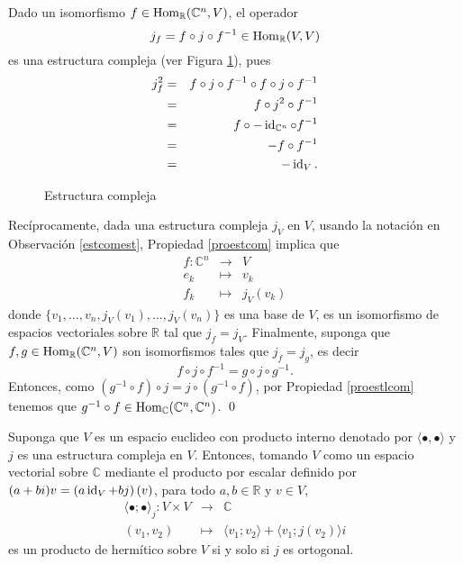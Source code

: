 \dem Dado un isomorfismo $f\in\operatorname{Hom}_{\mathbb{R}}(\mathbb{C}^n,V)$, el operador
\[
j_f=f\circ j\circ f^{-1}\in\operatorname{Hom}_\mathbb{R}(V,V)
\]
es una estructura compleja (ver Figura \ref{estcomp}), pues
\begin{eqnarray*}
j_f^2 & = & f\circ j\circ f^{-1}\circ f\circ j\circ f^{-1}\\
         & = & f\circ j^2\circ f^{-1}\\
         & = & f\circ-\operatorname{id}_{\mathbb{C}^n}\circ f^{-1}\\
         & = & -f\circ f^{-1}\\
         & = & -\operatorname{id}_V.
\end{eqnarray*}
\begin{figure}[!hbp]
\centering
{}
\caption{Estructura compleja}
\label{estcomp}
\end{figure}
Rec\'iprocamente, dada una estructura compleja $j_V$ en $V$, usando la notaci\'on en Observaci\'on \ref{estcomest}, Propiedad \ref{proestcom} implica que
\begin{eqnarray*}
f:\mathbb{C}^n & \longrightarrow & V\\
e_k &\longmapsto & v_k\\
f_k &\longmapsto & j_V(v_k)
\end{eqnarray*}
donde $\{v_1,\ldots,v_n,j_V(v_1),\ldots,j_V(v_n)\}$ es una base de $V$, es un isomorfismo de espacios vectoriales sobre $\mathbb{R}$ tal que $j_f=j_V$. Finalmente, suponga que $f,g\in\operatorname{Hom}_{\mathbb{R}}(\mathbb{C}^n,V)$ son isomorfismos tales que $j_f=j_g$, es decir
$$f\circ j\circ f^{-1}=g\circ j\circ g^{-1}.$$
Entonces, como $(g^{-1}\circ f)\circ j=j\circ (g^{-1}\circ f)$, por Propiedad \ref{proestlcom} tenemos que $g^{-1}\circ f\in\operatorname{Hom}_{\mathbb{C}}(\mathbb{C}^n,\mathbb{C}^n)$. \qed

\begin{pro}
Suponga que $V$ es un espacio euclideo con producto interno denotado por $\langle\bullet,\bullet\rangle$ y $j$ es una estructura compleja en $V$. Entonces, tomando $V$ como un espacio vectorial sobre $\mathbb{C}$ mediante el producto por escalar definido por $(a+bi)v=\left(a\operatorname{id}_V+bj\right)(v)$, para todo $a,b\in\mathbb{R}$ y $v\in V$,
\begin{eqnarray*}
\langle\bullet;\bullet\rangle_j: V\times V & \longrightarrow & \mathbb{C}\\
(v_1,v_2) & \longmapsto & \langle v_1;v_2\rangle+\langle v_1;j(v_2)\rangle i
\end{eqnarray*}
es un producto de herm\'itico sobre $V$ si y solo si $j$ es ortogonal.
\end{pro}

